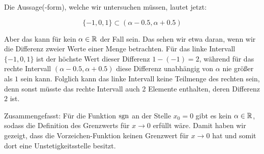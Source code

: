 Die Aussage(-form), welche wir untersuchen müssen, lautet jetzt:

$$
	\lbrace -1, 0, 1 \rbrace \subset ( \alpha - 0.5, \alpha + 0.5 )
$$

Aber das kann für kein $\alpha\in\mathbb{R}$ der Fall sein. Das sehen wir etwa daran, wenn wir die Differenz zweier Werte einer Menge betrachten. Für das linke Intervall $\lbrace -1, 0, 1 \rbrace$ ist der höchste Wert dieser Differenz $1-(-1) = 2$, während für das rechte Intervall $( \alpha - 0.5, \alpha + 0.5 )$ diese Differenz unabhängig von $\alpha$ nie größer als $1$ sein kann. Folglich kann das linke Intervall keine Teilmenge des rechten sein, denn sonst müsste das rechte Intervall auch 2 Elemente enthalten, deren Differenz $2$ ist. 

Zusammengefasst: Für die Funktion $\text{sgn}$ an der Stelle $x_0=0$ gibt es kein $\alpha\in\mathbb{R}$, sodass die Definition des Grenzwerts für $x\to 0$ erfüllt wäre. Damit haben wir gezeigt, dass die Vorzeichen-Funktion keinen Grenzwert für $x\to 0$ hat und somit dort eine Unstetigkeitsstelle besitzt.
